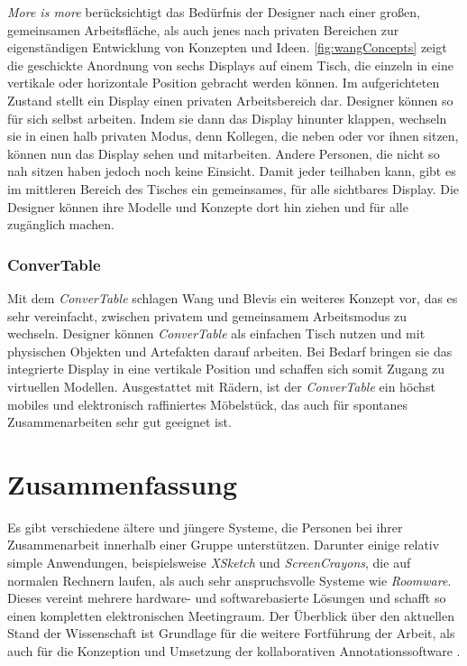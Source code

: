 \emph{More is more} berücksichtigt das Bedürfnis der Designer nach einer großen, gemeinsamen Arbeitsfläche, als auch jenes nach privaten Bereichen zur eigenständigen Entwicklung von Konzepten und Ideen. \autoref{fig:wangConcepts} zeigt die geschickte Anordnung von sechs Displays auf einem Tisch, die einzeln in eine vertikale oder horizontale Position gebracht werden können. Im aufgerichteten Zustand stellt ein Display einen privaten Arbeitsbereich dar. Designer können so für sich selbst arbeiten. Indem sie dann das Display hinunter klappen, wechseln sie in einen halb privaten Modus, denn Kollegen, die neben oder vor ihnen sitzen, können nun das Display sehen und mitarbeiten. Andere Personen, die nicht so nah sitzen haben jedoch noch keine Einsicht. Damit jeder teilhaben kann, gibt es im mittleren Bereich des Tisches ein gemeinsames, für alle sichtbares Display. Die Designer können ihre Modelle und Konzepte dort hin ziehen und für alle zugänglich machen.

\subsubsection{ConverTable} 

Mit dem \emph{ConverTable} schlagen Wang und Blevis ein weiteres Konzept vor, das es sehr vereinfacht, zwischen privatem und gemeinsamem Arbeitsmodus zu wechseln. Designer können \emph{ConverTable} als einfachen Tisch nutzen und mit physischen Objekten und Artefakten darauf arbeiten. Bei Bedarf bringen sie das integrierte Display in eine vertikale Position und schaffen sich somit Zugang zu virtuellen Modellen. Ausgestattet mit Rädern, ist der \emph{ConverTable} ein höchst mobiles und elektronisch raffiniertes Möbelstück, das auch für spontanes Zusammenarbeiten sehr gut geeignet ist.

\section*{Zusammenfassung}
Es gibt verschiedene ältere und jüngere Systeme, die Personen bei ihrer Zusammenarbeit innerhalb einer Gruppe unterstützen. Darunter einige relativ simple Anwendungen, beispielsweise \emph{XSketch} und \emph{ScreenCrayons}, die auf normalen Rechnern laufen, als auch sehr anspruchsvolle Systeme wie \emph{Roomware}. Dieses vereint mehrere hardware- und softwarebasierte Lösungen und schafft so einen kompletten elektronischen Meetingraum. Der Überblick über den aktuellen Stand der Wissenschaft ist Grundlage für die weitere Fortführung der Arbeit, als auch für die Konzeption und Umsetzung der kollaborativen Annotationssoftware \scribbler.

